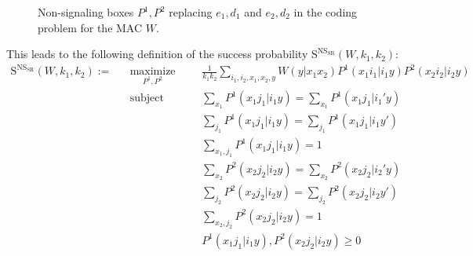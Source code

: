\documentclass[11pt]{article}
\theoremstyle{definition}
\theoremstyle{remark}
\DeclareMathOperator{\maxi}{\text{maximize}}
\DeclareMathOperator{\st}{\text{subject to}}
\begin{document}
\begin{figure}[!h]
\begin{center}
\end{center}
\caption{Non-signaling boxes $P^1,P^2$ replacing $e_1,d_1$ and $e_2,d_2$ in the coding problem for the MAC $W$.}
\label{fig:MACNSsrcoding}
\end{figure}

This leads to the following definition of the success probability $\mathrm{S}^{\mathrm{NS}_{\mathrm{SR}}}(W,k_1,k_2)$:
\begin{equation}
  \begin{aligned}
    \mathrm{S}^{\mathrm{NS}_{\mathrm{SR}}}(W,k_1,k_2) := &&\underset{P^1, P^2}{\maxi} &&& \frac{1}{k_1k_2} \sum_{i_1,i_2,x_1,x_2,y} W(y|x_1x_2)P^1(x_1i_1|i_1y)P^2(x_2i_2|i_2y)\\
    &&\st &&& \sum_{x_1} P^1(x_1j_1|i_1y) = \sum_{x_1} P^1(x_1j_1|i_1'y)\\
    &&&&& \sum_{j_1} P^1(x_1j_1|i_1y) = \sum_{j_1} P^1(x_1j_1|i_1y')\\
    &&&&& \sum_{x_1,j_1} P^1(x_1j_1|i_1y) = 1\\
    &&&&& \sum_{x_2} P^2(x_2j_2|i_2y) = \sum_{x_2} P^2(x_2j_2|i_2'y)\\
    &&&&& \sum_{j_2} P^2(x_2j_2|i_2y) = \sum_{j_2} P^2(x_2j_2|i_2y')\\
    &&&&& \sum_{x_2,j_2} P^2(x_2j_2|i_2y) = 1\\
    &&&&& P^1(x_1j_1|i_1y), P^2(x_2j_2|i_2y) \geq 0
  \end{aligned}
  \end{equation}
\end{document}
